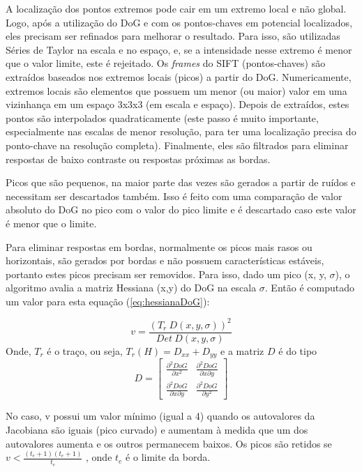 A localização dos pontos extremos pode cair em um extremo local e não global. Logo, após a utilização do DoG e com os pontos-chaves em potencial localizados, eles precisam ser refinados para melhorar o resultado. Para isso, são utilizadas Séries de Taylor na escala e no espaço, e, se a intensidade nesse extremo é menor que o valor limite, este é rejeitado.
Os \emph{frames} do SIFT (pontos-chaves) são extraídos baseados nos extremos locais (picos) a partir do DoG. Numericamente, extremos locais são elementos que possuem um menor (ou maior) valor em uma vizinhança em um espaço 3x3x3 (em escala e espaço).
Depois de extraídos, estes pontos são interpolados quadraticamente (este passo é muito importante, especialmente nas escalas de menor resolução, para ter uma localização precisa do ponto-chave na resolução completa). Finalmente, eles são filtrados para eliminar respostas de baixo contraste ou respostas próximas as bordas.


Picos que são pequenos, na maior parte das vezes são gerados a partir de ruídos e necessitam ser descartados também. Isso é feito com uma comparação de valor absoluto do DoG no pico com o valor do pico limite e é descartado caso este valor é menor que o limite.



Para eliminar respostas em bordas, normalmente os picos mais rasos ou horizontais, são gerados por bordas e não possuem características estáveis, portanto estes picos precisam ser removidos. Para isso, dado um pico (x, y, $\sigma$), o algoritmo avalia a matriz Hessiana (x,y) do DoG na escala $\sigma$. Então é computado um valor para esta equação (\ref{eq:hessianaDoG}):

\begin{equation}
	v = \frac{( T_r \ D(x,y,\sigma))^2}{Det \ D(x,y,\sigma)}
	\label{eq:hessianaDoG}
\end{equation}
Onde, $T_r$ é o traço, ou seja, $T_r(H) = D_{xx} + D_{yy}$ e a matriz $D$ é do tipo
\[D = \begin{bmatrix}
	\frac{\partial ^2 DoG}{\partial x^2} & \frac{\partial ^2 DoG}{\partial x \partial y} \\ 
	\frac{\partial ^2 DoG}{\partial x \partial y} & \frac{\partial ^2 DoG}{\partial y^2} 
\end{bmatrix}
\]

No caso, v possui um valor mínimo (igual a 4) quando os autovalores da Jacobiana são iguais (pico curvado) e aumentam à medida que um dos autovalores aumenta e os outros permanecem baixos. Os picos são retidos se $v  < \frac{(t_e+1)(t_e+1)}{t_e}$ , onde $t_e$ é o limite da borda. 

